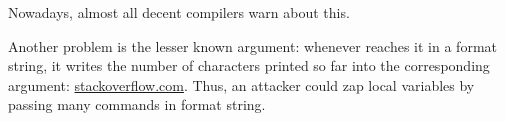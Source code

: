 Nowadays, almost all decent compilers warn about this.

Another problem is the lesser known  \printf argument: whenever \printf reaches it in a format string, it writes
the number of characters printed so far into the corresponding argument:
\href{http://stackoverflow.com/questions/3401156/what-is-the-use-of-the-n-format-specifier-in-c}{stackoverflow.com}.
Thus, an attacker could zap local variables by passing many  commands in format string.

